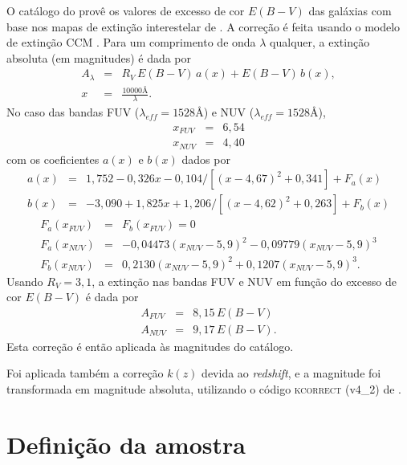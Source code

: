 O catálogo do \galex provê os valores de excesso de cor $E(B-V)$ das galáxias
com base nos mapas de extinção interestelar de \citet{Schlegel1998}. A correção
é feita usando o modelo de extinção CCM \citep[equações 4a e 4b]{Cardelli1989}.
Para um comprimento de onda $\lambda$ qualquer, a extinção absoluta (em
magnitudes) é dada por
\begin{eqnarray*}
	A_\lambda &=& R_V\,E(B-V)\,a(x) + E(B-V)\,b(x), \\
	x &=& \frac{10000\text{\AA}}{\lambda}.
\end{eqnarray*}
No caso das bandas FUV ($\lambda_{eff}=1528\text{\AA}$) e NUV
($\lambda_{eff}=1528\text{\AA}$),
\begin{eqnarray*}
	x_{FUV} &=& 6,54\\
	x_{NUV} &=& 4,40
\end{eqnarray*}
com os coeficientes $a(x)$ e $b(x)$ dados por
\begin{eqnarray*}
	a(x) &=& 1,752 - 0,326x - 0,104/[(x-4,67)^2 + 0,341] + F_a(x) \\
	b(x) &=& -3,090 + 1,825x + 1,206/[(x-4,62)^2 + 0,263] + F_b(x)
\end{eqnarray*}
\begin{eqnarray*}
	F_a(x_{FUV}) &=& F_b(x_{FUV}) = 0 \\
	F_a(x_{NUV}) &=& -0,04473(x_{NUV}-5,9)^2 - 0,09779(x_{NUV}-5,9)^3 \\
	F_b(x_{NUV}) &=& 0,2130(x_{NUV}-5,9)^2 + 0,1207(x_{NUV}-5,9)^3.
\end{eqnarray*}
Usando $R_V=3,1$, a extinção nas bandas FUV e NUV em função do excesso de cor
$E(B-V)$ é dada por
\begin{eqnarray*}
	A_{FUV} &=& 8,15\,E(B-V) \\
	A_{NUV} &=& 9,17\,E(B-V).
\end{eqnarray*}
Esta correção é então aplicada às magnitudes do catálogo.

Foi aplicada também a correção $k(z)$ devida ao {\em redshift}, e a magnitude
foi transformada em magnitude absoluta, utilizando o código \textsc{kcorrect}
(v4\_2) de \citet{Blanton2007}.



\section{Definição da amostra \STARLIGHTUV}

